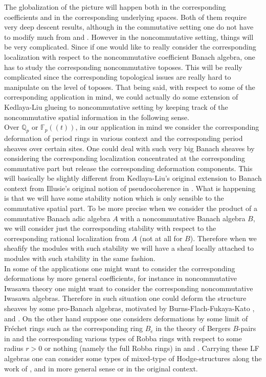 \documentclass[12pt]{amsart}
\theoremstyle{definition}
\numberwithin{equation}{section}
\begin{document}
\indent The globalization of the picture will happen both in the corresponding coefficients and in the corresponding underlying spaces. Both of them require very deep descent results, although in the commutative setting one do not have to modify much from \cite{KL1} and \cite{KL2}. However in the noncommutative setting, things will be very complicated. Since if one would like to really consider the corresponding localization with respect to the noncommutative coefficient Banach algebra, one has to study the corresponding noncommutative toposes. This will be really complicated since the corresponding topological issues are really  hard to manipulate on the level of toposes. That being said, with respect to some of the corresponding application in mind, we could actually do some extension of Kedlaya-Liu glueing to noncommutative setting by keeping track of the noncommutative spatial information in the following sense.\\


\indent Over $\mathbb{Q}_p$ or $\mathbb{F}_p((t))$, in our application in mind we consider the corresponding deformation of period rings in various context and the corresponding period sheaves over certain sites. One could deal with such very big Banach sheaves by considering the corresponding localization concentrated at the corresponding commutative part but release the corresponding deformation components. This will basically be slightly different from Kedlaya-Liu's original extension to Banach context \cite{KL2} from Illusie's original notion of pseudocoherence in \cite{SGAVI}. What is happening is that we will have some stability notion which is only sensible to the commutative spatial part. To be more precise when we consider the product of a commutative Banach adic algebra $A$ with a noncommutative Banach algebra $B$, we will consider just the corresponding stability with respect to the corresponding rational localization from $A$ (not at all for $B$). Therefore when we sheafify the modules with such stability we will have a sheaf locally attached to modules with such stability in the same fashion.\\


\indent In some of the applications one might want to consider the corresponding deformations by more general coefficients, for instance in noncommutative Iwasawa theory one might want to consider the corresponding noncommutative Iwasawa algebras. Therefore in such situation one could deform the structure sheaves by some pro-Banach algebras, motivated by Burns-Flach-Fukaya-Kato \cite{BF1}, \cite{BF2} and \cite{FK1}. On the other hand suppose one considers deformations by some limit of Fr\'echet rings such as the corresponding ring $B_e$ in the theory of Bergers $B$-pairs in \cite{Ber1} and the corresponding various types of Robba rings with respect to some radius $r>0$ or nothing (namely the full Robba rings) in \cite{KL1} and \cite{KL2}. Carrying these LF algebras one can consider some types of mixed-type of Hodge-structures along the work of \cite{CKZ}, \cite{PZ} and \cite{Ked1} in more general sense or in the original context.\\
\end{document}
